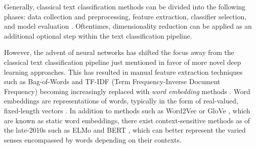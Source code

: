 \documentclass[english,bachelor,ul]{webisthesis} %
\begin{document}
Generally, classical text classification methods can be divided into the following phases: data collection and preprocessing, feature extraction, classifier selection, and model evaluation \citep{DBLP:journals/information/KowsariMHMBB19, DBLP:journals/eswa/MironczukP18, ikonomakis2005text}. Oftentimes, dimensionality reduction can be applied as an additional optional step within the text classification pipeline.

However, the advent of neural networks has shifted the focus away from the classical text classification pipeline just mentioned in favor of more novel deep learning approaches. This has resulted in manual feature extraction techniques such as Bag-of-Words and TF-IDF (Term Frequency-Inverse Document Frequency) becoming increasingly replaced with \textit{word embedding} methods \citep{DBLP:journals/csur/MinaeeKCNCG21}. Word embeddings are representations of words, typically in the form of real-valued, fixed-length vectors \citep{DBLP:journals/corr/abs-1901-09069}. In addition to methods such as Word2Vec \citep{DBLP:journals/corr/abs-1301-3781, DBLP:conf/nips/MikolovSCCD13} or GloVe \citep{DBLP:conf/emnlp/PenningtonSM14}, which are known as static word embeddings, there exist context-sensitive methods as of the late-2010s such as ELMo \citep{DBLP:conf/naacl/PetersNIGCLZ18} and BERT \citep{DBLP:conf/naacl/DevlinCLT19}, which can better represent the varied senses encompassed by words depending on their contexts.
\end{document}
